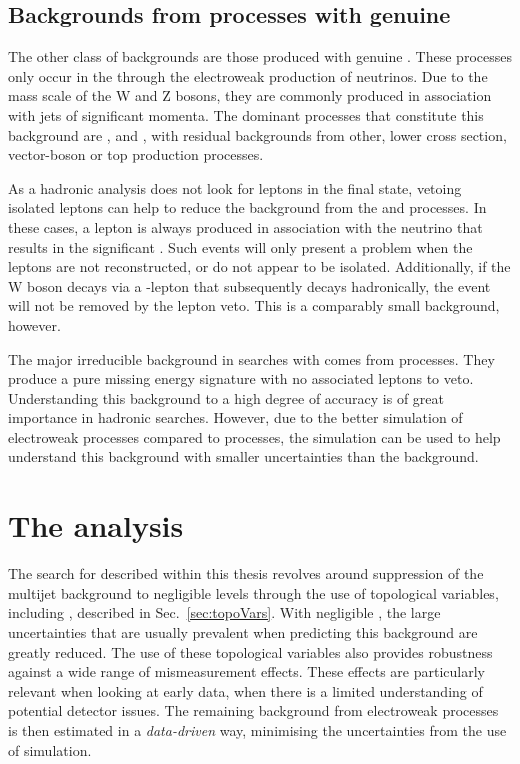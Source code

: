 
\subsection{Backgrounds from \SM processes with genuine
\MET}

The other class of \SM backgrounds are those produced with genuine
\MET. These processes only occur in the \SM through the electroweak
production of neutrinos. Due to the
mass scale of the W and Z bosons, they are commonly produced in
association with jets of significant momenta. The dominant
processes that constitute this background are \wj, \zj and \ttbar,
with residual backgrounds from other, lower cross section,
vector-boson or top production processes.

As a hadronic analysis does not look for leptons in the final state,
vetoing isolated leptons can help to reduce the background from the
\wj and \ttbar processes. In these cases, a lepton is always produced
in association with the neutrino that results in the significant \MET.
Such events will only present a problem when the leptons are not
reconstructed, or do not appear to be isolated. Additionally, if the W boson
decays via a \tau-lepton that subsequently decays hadronically, the
event will not be removed by the lepton veto.  This is a comparably
small background, however.

The major irreducible background in \BSM searches with \MET comes from 
\znunu processes. They produce a pure missing energy signature with no
associated leptons to veto. Understanding this background to a high
degree of accuracy is of great importance in hadronic \BSM searches. However, due
to the better simulation of electroweak processes compared to \QCD
processes, the simulation can be used to help understand this
background with smaller uncertainties than the \QCD background.

\section{The \alphat analysis} 

The search for \SUSY described within this thesis revolves around
suppression of the \QCD multijet background to negligible levels
through the use of topological variables, including \alphat, described
in Sec.~\ref{sec:topoVars}. With negligible \QCD, the large
uncertainties that are usually prevalent when predicting this
background are greatly reduced. The use of these topological variables
also provides robustness against a wide range of mismeasurement
effects. These effects are particularly relevant when looking at early
data, when there is a limited understanding of potential detector
issues. The remaining background from electroweak processes is then
estimated in a \emph{data-driven} way, minimising the uncertainties
from the use of simulation.

